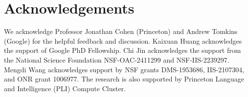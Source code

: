 \section*{Acknowledgements}
We acknowledge Professor Jonathan Cohen (Princeton) and Andrew Tomkins (Google) for the helpful feedback and discussion.
Kaixuan Huang acknowledges the support of Google PhD Fellowship.
Chi Jin acknowledges the support from the National Science Foundation NSF-OAC-2411299 and NSF-IIS-2239297.
Mengdi Wang acknowledges support by NSF grants DMS-1953686, IIS-2107304, and ONR grant 1006977.
The research is also supported by Princeton Language and Intelligence (PLI) Compute Cluster.
